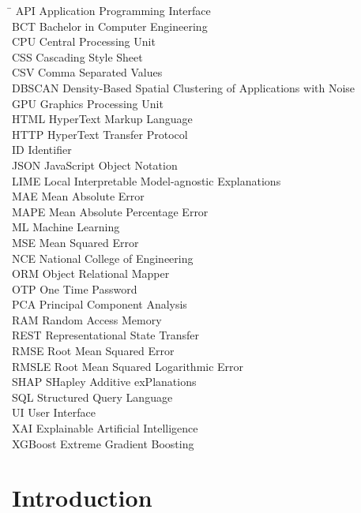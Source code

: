 \documentclass[12pt]{report}
\numberwithin{figure}{chapter}
\numberwithin{table}{chapter}
\numberwithin{equation}{chapter}
\begin{document}
\begin{tabbing}
\hspace{3cm} \= \kill
API \> Application Programming Interface \\
BCT \> Bachelor in Computer Engineering \\
CPU \> Central Processing Unit \\
CSS \> Cascading Style Sheet \\
CSV \> Comma Separated Values \\
DBSCAN \> Density-Based Spatial Clustering of Applications with Noise \\
GPU \> Graphics Processing Unit \\
HTML \> HyperText Markup Language \\
HTTP \> HyperText Transfer Protocol \\
ID \> Identifier \\
JSON \> JavaScript Object Notation \\
LIME \> Local Interpretable Model-agnostic Explanations \\
MAE \> Mean Absolute Error \\
MAPE \> Mean Absolute Percentage Error \\
ML \> Machine Learning \\
MSE \> Mean Squared Error \\
NCE \> National College of Engineering \\
ORM \> Object Relational Mapper \\
OTP \> One Time Password \\
PCA \> Principal Component Analysis \\
RAM \> Random Access Memory \\
REST \> Representational State Transfer \\
RMSE \> Root Mean Squared Error \\
RMSLE \> Root Mean Squared Logarithmic Error \\
SHAP \> SHapley Additive exPlanations \\
SQL \> Structured Query Language \\
UI \> User Interface \\
XAI \> Explainable Artificial Intelligence \\
XGBoost \> Extreme Gradient Boosting \\
\end{tabbing}
\chapter{Introduction}
\end{document}
